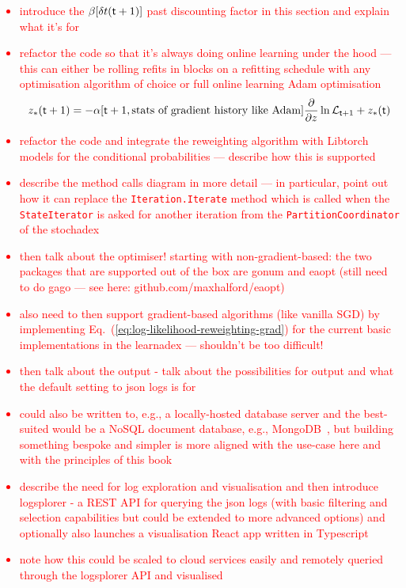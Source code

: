 \textcolor{red}{\begin{itemize}
\item{introduce the $\beta [\delta t({\sf t}+1)]$ past discounting factor in this section and explain what it's for}
\item{refactor the code so that it's always doing online learning under the hood --- this can either be rolling refits in blocks on a refitting schedule with any optimisation algorithm of choice or full online learning Adam optimisation $$z_*({\sf t}+1) = -\alpha [{\sf t}+1,\text{stats of gradient history like Adam}] \frac{\partial}{\partial z} \ln {\cal L}_{{\sf t}+1} + z_*({\sf t})$$}
\item{refactor the code and integrate the reweighting algorithm with Libtorch models for the conditional probabilities --- describe how this is supported}
\item{describe the method calls diagram in more detail --- in particular, point out how it can replace the \texttt{Iteration.Iterate} method which is called when the \texttt{StateIterator} is asked for another iteration from the \texttt{PartitionCoordinator} of the stochadex}
\item{then talk about the optimiser! starting with non-gradient-based: the two packages that are supported out of the box are gonum and eaopt (still need to do gago --- see here: github.com/maxhalford/eaopt) }
\item{also need to then support gradient-based algorithms (like vanilla SGD) by implementing Eq.~(\ref{eq:log-likelihood-reweighting-grad}) for the current basic implementations in the learnadex --- shouldn't be too difficult!}
\item{then talk about the output - talk about the possibilities for output and what the default setting to json logs is for}
\item{could also be written to, e.g., a locally-hosted database server and the best-suited would be a NoSQL document database, e.g., MongoDB~\cite{mongodb}, but building something bespoke and simpler is more aligned with the use-case here and with the principles of this book}
\item{describe the need for log exploration and visualisation and then introduce logsplorer - a REST API for querying the json logs (with basic filtering and selection capabilities but could be extended to more advanced options) and optionally also launches a visualisation React app written in Typescript}
\item{note how this could be scaled to cloud services easily and remotely queried through the logsplorer API and visualised} 
\end{itemize}}

